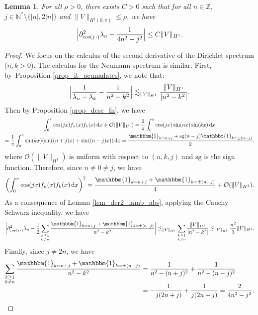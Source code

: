 \documentclass[JEP,XML,SOM,Unicode,NoEqCountersInSection,published]{cedram}
\newtheorem{lemma}[theorem]{Lemma}
\theoremstyle{definition}
\begin{document}
\begin{lemma}
\label{lem_est_d2} For all $\rho >0$, there exists $C>0$ such that for all $n\in \mathbb{Z}$, $j\in \mathbb{N}^* \setminus \{ |n|,2|n|\}$ and $\|V\|_{H^1(0,\pi)} \leq \rho$, we have
\[
\Bigl| \partial^2_{\cos(j \,\cdot)}\lambda_n - \frac1{4n^2 -j^2} \Bigr| \leq C \|V\|_{H^1}.
\]

\end{lemma}
\begin{proof} We focus on the calculus of the second derivative of the Dirichlet spectrum (\ie $n,k>0$). The calculus for the Neumann spectrum is similar. First, by~Proposition \ref{prop_it_acumulates}, we note that:
\[
\Bigl| \frac1{\lambda_n - \lambda_k} - \frac1{n^2 - k^2} \Bigr| \lesssim_{\|V\|_{H^1}} \frac{\|V\|_{H^1}}{|n^2-k^2|}.
\]
Then by Proposition \ref{prop_desc_fn}, we have
\begin{multline*}
\int_0^\pi \cos(j x) f_n(x) f_k(x) \, \mathrm{d}x + \mathcal{O}(\| V\|_{H^1}) = \frac2\pi \int_0^\pi \cos(j x) \sin(n x) \sin(k x) \, \mathrm{d}x \\
= \frac1\pi \int_0^\pi \sin(kx) (\sin((n+j)x)+\sin((n-j)x)) \, \mathrm{d}x = \frac{\mathbbm{1}_{k=n+j} + \mathrm{sg}(n-j) \mathbbm{1}_{k=\pm (n-j)} }2,
\end{multline*}
where $\mathcal{O}(\| V\|_{H^1})$ is uniform with respect to $(n,k,j)$ and $\mathrm{sg}$ is the sign function. Therefore, since $n\neq 0\neq j$, we have
\[
\left(\int_0^\pi \cos(j x) f_n(x) f_k(x) \, \mathrm{d}x \right)^2 = \frac{\mathbbm{1}_{k=n+j} + \mathbbm{1}_{k=\pm (n-j)} }4 + \mathcal{O}(\| V\|_{H^1}).
\]
As a consequence of Lemma \ref{lem_der2_lamb_abs}, applying the Cauchy Schwarz inequality, we have
\[
\biggl| \partial^2_{\cos(j \,\cdot)}\lambda_n - \frac12\sum_{\substack{k \geq 1\\ k\neq n}} \frac{\mathbbm{1}_{k=n+j} + \mathbbm{1}_{k=\pm (n-j)}}{ n^2-k^2} \biggr|\lesssim_{\|V\|_{H^1}} \sum_{\substack{k \geq 1\\ k\neq n}} \frac{\|V\|_{H^1}}{|n^2-k^2|} \lesssim_{\|V\|_{H^1}} \frac{\pi^2}3 \|V\|_{H^1}.
\]
Finally, since $j\neq 2n$, we have
\begin{align*}
\sum_{\substack{k \geq 1\\ k\neq n}} \frac{\mathbbm{1}_{k=n+j} + \mathbbm{1}_{k=\pm (n-j)}}{ n^2-k^2} &= \frac{1}{n^2 - (n+j)^2} + \frac{1}{n^2 - (n-j)^2}\\[-5pt]
&= -\frac1{j(2n+j)} + \frac1{j(2n-j)} = \frac2{4n^2-j^2}.\qedhere
\end{align*}
\end{proof}
\end{document}
